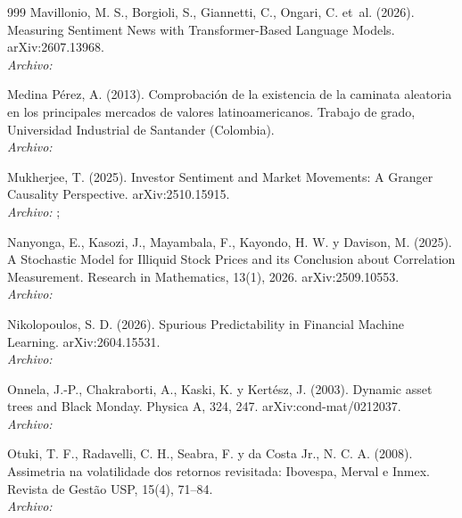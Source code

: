 \begin{thebibliography}{999}
Mavillonio, M. S., Borgioli, S., Giannetti, C., Ongari, C. et~al. (2026). Measuring Sentiment News with Transformer-Based Language Models. arXiv:2607.13968.
\\\textit{Archivo:} 

Medina Pérez, A. (2013). Comprobación de la existencia de la caminata aleatoria en los principales mercados de valores latinoamericanos. Trabajo de grado, Universidad Industrial de Santander (Colombia).
\\\textit{Archivo:} 

Mukherjee, T. (2025). Investor Sentiment and Market Movements: A Granger Causality Perspective. arXiv:2510.15915.
\\\textit{Archivo:} ; 

Nanyonga, E., Kasozi, J., Mayambala, F., Kayondo, H. W. y Davison, M. (2025). A Stochastic Model for Illiquid Stock Prices and its Conclusion about Correlation Measurement. Research in Mathematics, 13(1), 2026. arXiv:2509.10553.
\\\textit{Archivo:} 

Nikolopoulos, S. D. (2026). Spurious Predictability in Financial Machine Learning. arXiv:2604.15531.
\\\textit{Archivo:} 

Onnela, J.-P., Chakraborti, A., Kaski, K. y Kertész, J. (2003). Dynamic asset trees and Black Monday. Physica A, 324, 247. arXiv:cond-mat/0212037.
\\\textit{Archivo:} 

Otuki, T. F., Radavelli, C. H., Seabra, F. y da Costa Jr., N. C. A. (2008). Assimetria na volatilidade dos retornos revisitada: Ibovespa, Merval e Inmex. Revista de Gestão USP, 15(4), 71–84.
\\\textit{Archivo:} 


\end{thebibliography}
